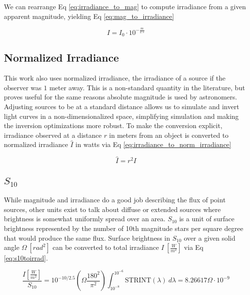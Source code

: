 We can rearrange Eq \ref{eq:irradiance_to_mag} to compute irradiance from a given apparent magnitude,
yielding Eq \ref{eq:mag_to_irradiance}

\begin{equation} \label{eq:mag_to_irradiance}
  I = I_0 \cdot 10^{-\frac{m}{2.5}}
\end{equation}

\subsection{Normalized Irradiance}

This work also uses normalized irradiance, the irradiance of a source if the observer was $1$ meter
away. This is a non-standard quantity in the literature, but proves useful for the same reasons
absolute magnitude is used by astronomers. Adjusting sources to be at a standard distance allows us
to simulate and invert light curves in a non-dimensionalized space, simplifying simulation and
making the inversion optimizations more robust. To make the conversion explicit, irradiance observed
at a distance $r$ in meters from an object is converted to normalized irradiance $\hat{I}$ in watts via Eq
\ref{eq:irradiance_to_norm_irradiance}

\begin{equation} \label{eq:irradiance_to_norm_irradiance}
  \hat{I} = r^2 I
\end{equation}

\subsection{$S_{10}$}

While magnitude and irradiance do a good job describing the flux of point sources, other units exist
to talk about diffuse or extended sources where brightness is somewhat uniformly spread over an
area. $S_{10}$ is a unit of surface brightness represented by the number of 10th magnitude stars per square degree that would produce the same flux.
Surface brightness in $S_{10}$ over a given solid angle $\Omega \: \left[ rad^2 \right]$ can be converted to total irradiance $I \: \left[ \frac{W}{m^2} \right]$ via Eq \ref{eq:s10toirrad}.

\begin{equation} \label{eq:s10toirrad}
 \frac{I \left[ \frac{W}{m^2} \right]}{S_{10}} = 10^{-10/2.5} \left( \Omega \frac{180^2}{\pi^2} \right)
  \int_{10^{-8}}^{10^{-6}}{ \textrm{STRINT}(\lambda) \: d\lambda} = 8.26617 \Omega \cdot 10^{-9}
\end{equation}

